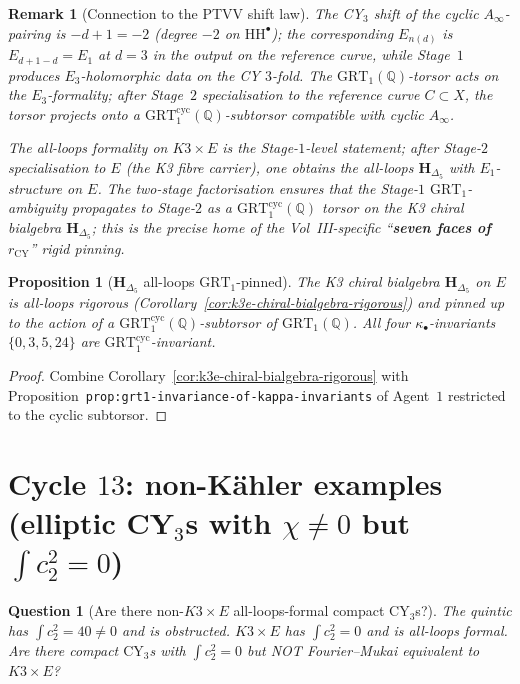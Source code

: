 \documentclass[11pt]{article}
\newtheorem{proposition}[theorem]{Proposition}
\newtheorem{remark}[theorem]{Remark}
\newtheorem{question}[theorem]{Question}
\providecommand{\CY}{\mathrm{CY}}
\providecommand{\HH}{\mathrm{HH}}
\providecommand{\QQ}{\mathbb{Q}}
\providecommand{\GRT}{\mathrm{GRT}}
\begin{document}
\begin{remark}[Connection to the PTVV shift law]
\label{rem:ptvv-connection}
The CY$_3$ shift of the cyclic $A_\infty$-pairing is $-d + 1 = -2$
(degree $-2$ on $\HH^\bullet$); the corresponding $E_{n(d)}$ is
$E_{d+1-d} = E_1$ at $d = 3$ in the output on the reference
curve, while Stage~$1$ produces $E_3$-holomorphic data on the
CY $3$-fold.  The $\GRT_1(\QQ)$-torsor acts on the $E_3$-formality;
after Stage~$2$ specialisation to the reference curve $C \subset X$,
the torsor projects onto a $\GRT_1^{\mathrm{cyc}}(\QQ)$-subtorsor
compatible with cyclic $A_\infty$.

The all-loops formality on $K3 \times E$ is the Stage-$1$-level
statement;  after Stage-$2$ specialisation to $E$ (the K3 fibre
carrier), one obtains the all-loops $\mathbf H_{\Delta_5}$ with
$E_1$-structure on $E$.  The two-stage factorisation ensures that
the Stage-$1$ $\GRT_1$-ambiguity propagates to Stage-$2$ as a
$\GRT_1^{\mathrm{cyc}}(\QQ)$ torsor on the K3 chiral bialgebra
$\mathbf H_{\Delta_5}$;  this is the precise home of the
Vol~III-specific ``\textbf{seven faces of $r_{\mathrm{CY}}$}'' rigid
pinning.
\end{remark}

\begin{proposition}[$\mathbf H_{\Delta_5}$ all-loops $\GRT_1$-pinned]
\label{prop:h-delta5-grt1-pinned}
\ClaimStatusTheorem
The K3 chiral bialgebra $\mathbf H_{\Delta_5}$ on $E$ is
all-loops rigorous (Corollary~\ref{cor:k3e-chiral-bialgebra-rigorous})
and pinned up to the action of a
$\GRT_1^{\mathrm{cyc}}(\QQ)$-subtorsor of $\GRT_1(\QQ)$.  All four
$\kappa_\bullet$-invariants $\{0, 3, 5, 24\}$ are
$\GRT_1^{\mathrm{cyc}}$-invariant.
\end{proposition}

\begin{proof}
Combine Corollary~\ref{cor:k3e-chiral-bialgebra-rigorous} with
Proposition~\texttt{prop:grt1-invariance-of-kappa-invariants} of
Agent~$1$ restricted to the cyclic subtorsor.
\end{proof}

\section{Cycle $13$:  non-K\"ahler examples (elliptic CY$_3$s with
$\chi \neq 0$ but $\int c_2^2 = 0$)}
\label{sec:cycle-13-non-kahler}

\begin{question}[Are there non-$K3\times E$ all-loops-formal compact
$\CY_3$s?]
\label{q:other-all-loops}
The quintic has $\int c_2^2 = 40 \neq 0$ and is obstructed.
$K3 \times E$ has $\int c_2^2 = 0$ and is all-loops formal.  Are
there compact $\CY_3$s with $\int c_2^2 = 0$ but NOT Fourier--Mukai
equivalent to $K3 \times E$?
\end{question}
\end{document}
